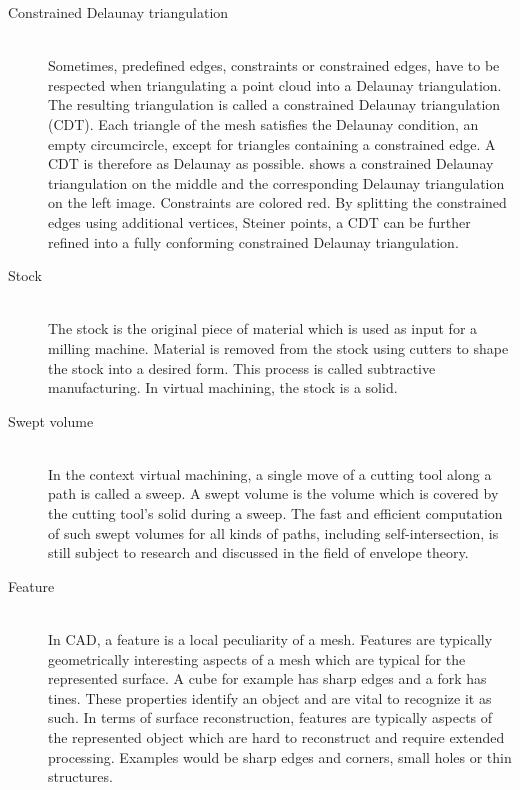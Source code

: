 \begin{description}
	\item[Constrained Delaunay triangulation] \hfill \\
	Sometimes, predefined edges, \ie constraints or constrained edges, have to be respected when triangulating a point cloud into a Delaunay triangulation.
	The resulting triangulation is called a constrained Delaunay triangulation (CDT).
	Each triangle of the mesh satisfies the Delaunay condition, \ie an empty circumcircle, except for triangles containing a constrained edge.
	A CDT is therefore as Delaunay as possible.
	 shows a constrained Delaunay triangulation on the middle and the corresponding Delaunay triangulation on the left image.
	Constraints are colored red.
	By splitting the constrained edges using additional vertices, \ie Steiner points, a CDT can be further refined into a fully conforming constrained Delaunay triangulation.


	\item[Stock] \hfill \\
	The stock is the original piece of material which is used as input for a milling machine.
	Material is removed from the stock using cutters to shape the stock into a desired form.
	This process is called subtractive manufacturing.
	In virtual machining, the stock is a solid.


	\item[Swept volume] \hfill \\
	In the context virtual machining, a single move of a cutting tool along a path is called a sweep.
	A swept volume is the volume which is covered by the cutting tool's solid during a sweep.
	The fast and efficient computation of such swept volumes for all kinds of paths, including self-intersection, is still subject to research and discussed in the field of envelope theory.


	\item[Feature] \hfill \\
	In CAD, a feature is a local peculiarity of a mesh.
	Features are typically geometrically interesting aspects of a mesh which are typical for the represented surface.
	A cube for example has sharp edges and a fork has tines.
	These properties identify an object and are vital to recognize it as such.
	In terms of surface reconstruction, features are typically aspects of the represented object which are hard to reconstruct and require extended processing.
	Examples would be sharp edges and corners, small holes or thin structures.

\end{description}

